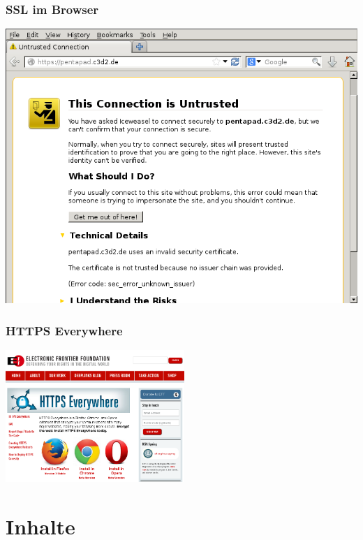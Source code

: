 \documentclass[12pt]{beamer}
\begin{document}
\begin{frame}
    \frametitle{SSL im Browser}
    \includegraphics[height=0.7\textheight]{img/ssl_unverified.png}
\end{frame}


\begin{frame}
  \frametitle{HTTPS Everywhere}
    \begin{center}
      \includegraphics[height=5cm]{img/https-everywhere.png}
    \end{center}
\end{frame}

\section{Inhalte}
\end{document}
